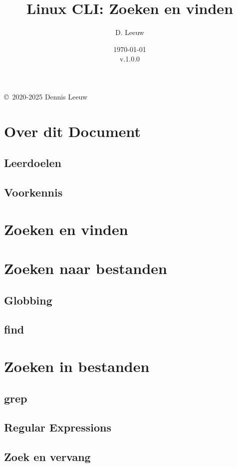 \documentclass[a4paper,12pt,twoside,openright,titlepage]{book}
\author{D. Leeuw}
\title{Linux CLI: Zoeken en vinden}
\date{\today\\v.1.0.0}
\begin{document}

\maketitle

\copyright\ 2020-2025 Dennis Leeuw\\




\frontmatter
\chapter{Over dit Document}
\section{Leerdoelen}

\section{Voorkennis}

%
%

\tableofcontents

\mainmatter

\chapter{Zoeken en vinden}\label{zoekenenvinden}

\chapter{Zoeken naar bestanden}
\section{Globbing}

\section{find}


\chapter{Zoeken in bestanden}

\section{grep}

\section{Regular Expressions}

\section{Zoek en vervang}


\backmatter
\printindex
\end{document}
